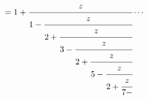 \[=1+\cfrac{z}{1-\cfrac{z}{2+\cfrac{z}{3-\cfrac{z}{2+\cfrac{z}{5-\cfrac{z}{2+%
\cfrac{z}{7-}}}}}}}\cdots\]